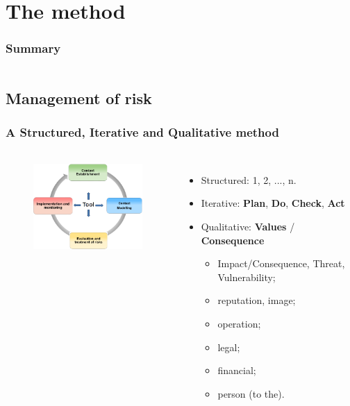 
%
%
\section{The method}
\begin{frame}
    \frametitle{Summary}
    \begin{columns}[t]
        \begin{column}{5cm}
            \tableofcontents[sections={1-3}, currentsection, hideothersubsections]
        \end{column}
        \begin{column}{5cm}
            \tableofcontents[sections={4-6}, currentsection, hideothersubsections]
        \end{column}
    \end{columns}
\end{frame}


\subsection{Management of risk}
\begin{frame}
    \frametitle{A Structured, Iterative and Qualitative method}
    \framesubtitle{}
    \begin{columns}[t]
        \column{5.5cm}
        \begin{figure}
        \includegraphics[width=5.5cm]{./images/MONARC-method-1.png}
        \end{figure}
        \column{6.5cm}
        \begin{itemize}
                \item Structured: 1, 2, ..., n.
                \item Iterative: \textbf{Plan}, \textbf{Do}, \textbf{Check}, \textbf{Act}
                \item Qualitative: \textbf{Values} / \textbf{Consequence}
                    \begin{itemize}
                        \item Impact/Consequence, Threat, Vulnerability;
                        \item reputation, image;
                        \item operation;
                        \item legal;
                        \item financial;
                        \item person (to the).
                    \end{itemize}
        \end{itemize}
        \end{columns}

\end{frame}

